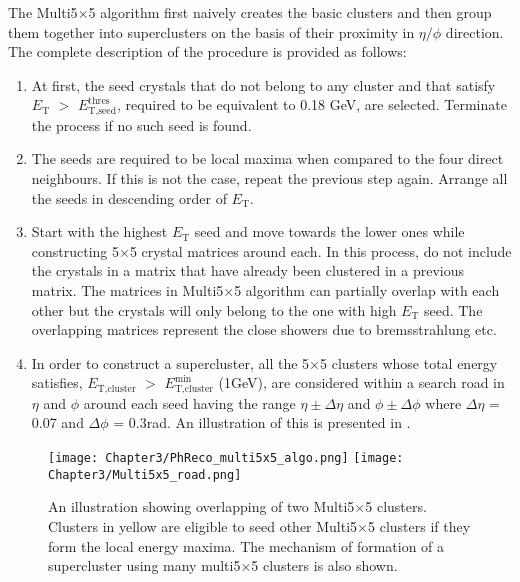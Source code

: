 \begin{itemize}[leftmargin=*]
  The Multi5$\times$5 algorithm first naively creates the basic clusters and then group them together into superclusters on the basis of their proximity in $\eta/\phi$
  direction. The complete description of the procedure is provided as follows:
  \begin{enumerate}
  \item At first, the seed crystals that do not belong to any cluster and that satisfy  $E_{\textrm{T}}$ $>$ $E_{\textrm{T,seed}}^{\textrm{thres}}$,
    required to be equivalent to 0.18 \unit{GeV}, are selected. Terminate the process if no such seed is found.
  \item The seeds are required to be local maxima when compared to the four direct neighbours. If this is not the case, repeat the previous step again.
    Arrange all the seeds in descending order of $E_{\textrm{T}}$.
  \item Start with the highest $E_{\textrm{T}}$ seed and move towards the lower ones while constructing 5$\times$5 crystal matrices around each.
    In this process, do not include the crystals in a matrix that have already been clustered in a previous matrix. The matrices in Multi5$\times$5 algorithm
    can partially overlap with each other
    but the crystals will only belong to the one with high $E_{\textrm{T}}$ seed. The overlapping
    matrices represent the close showers due to bremsstrahlung etc.
\item In order to construct a supercluster, all the 5$\times$5 clusters whose total energy satisfies, $E_{\textrm{T,cluster}}$ $>$      
  $E_{\textrm{T,cluster}}^{\textrm{min}}$ (1\unit{GeV}), are considered within a search road in $\eta$ and $\phi$ around each seed having the range $\eta\pm\Delta\eta$
  and $\phi\pm\Delta\phi$ where $\Delta\eta$ = 0.07 and $\Delta\phi$ = 0.3\unit{rad}. An illustration of this is presented in \fig{\ref{fig:Multi5x5}}.
  \end{enumerate} 
  \begin{figure}[h]
  \begin{center}
  \texttt{[image: Chapter3/PhReco\_multi5x5\_algo.png]}
  \texttt{[image: Chapter3/Multi5x5\_road.png]}
  \caption{An illustration showing overlapping of two Multi5$\times$5 clusters. Clusters in yellow are eligible to seed other Multi5$\times$5 clusters if
    they form the local energy maxima. The mechanism of formation of a supercluster using many multi5$\times$5 clusters is also shown.}
  \label{fig:Multi5x5}
  \end{center}
  \end{figure}
\end{itemize}
\vspace{-0.2in}

